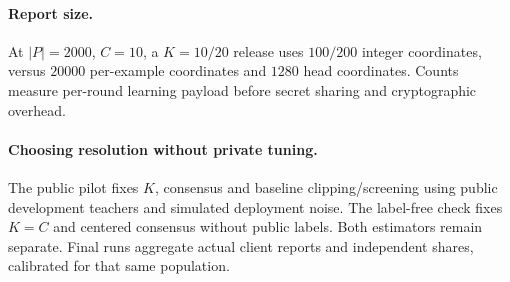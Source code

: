 \paragraph{Report size.}
At $|P|=2000$, $C=10$, a $K=10/20$ release uses $100/200$ integer
coordinates, versus $20000$ per-example coordinates and $1280$ head coordinates.
Counts measure per-round learning payload before secret sharing and
cryptographic overhead.

\paragraph{Choosing resolution without private tuning.}
The public pilot fixes $K$, consensus and baseline clipping/screening using
public development teachers and simulated deployment noise. The label-free
check fixes $K=C$ and centered consensus without public labels. Both estimators
remain separate. Final runs aggregate actual client reports and independent
shares, calibrated for that same population.
